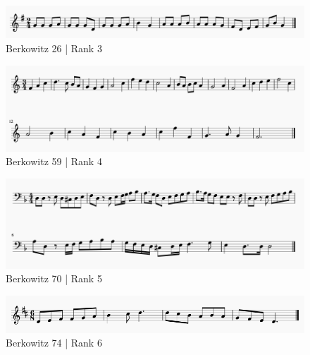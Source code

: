 \documentclass[]{book}
\begin{document}
\begin{figure}

{\centering \includegraphics[width=1\linewidth]{img/survey_melodies/Berkowitz26} 

}

\caption{Berkowitz 26 | Rank 3}\label{fig:berk26}
\end{figure}

\begin{figure}

{\centering \includegraphics[width=1\linewidth]{img/survey_melodies/Berkowitz59} 

}

\caption{Berkowitz 59 | Rank 4}\label{fig:berk59}
\end{figure}

\begin{figure}

{\centering \includegraphics[width=1\linewidth]{img/survey_melodies/Berkowitz70} 

}

\caption{Berkowitz 70 | Rank 5}\label{fig:berk70}
\end{figure}

\begin{figure}

{\centering \includegraphics[width=1\linewidth]{img/survey_melodies/Berkowitz74} 

}

\caption{Berkowitz 74 | Rank 6}\label{fig:berk74}
\end{figure}
\end{document}
